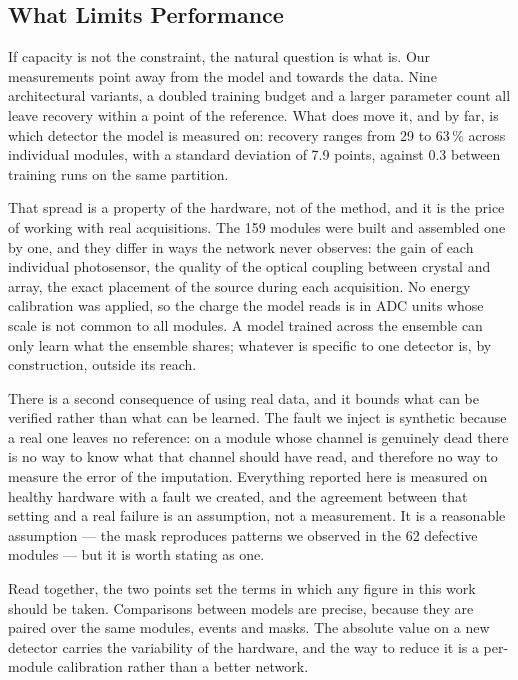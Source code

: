 \documentclass[10pt,conference]{IEEEtran}
\begin{document}
\subsection{What Limits Performance}
\label{sec:disc-limits}

If capacity is not the constraint, the natural question is what is. Our
measurements point away from the model and towards the data. Nine architectural
variants, a doubled training budget and a larger parameter count all leave
recovery within a point of the reference. What does move it, and by far, is
which detector the model is measured on: recovery ranges from 29 to 63\,\%
across individual modules, with a standard deviation of 7.9 points, against 0.3
between training runs on the same partition.

That spread is a property of the hardware, not of the method, and it is the
price of working with real acquisitions. The 159 modules were built and
assembled one by one, and they differ in ways the network never observes: the
gain of each individual photosensor, the quality of the optical coupling
between crystal and array, the exact placement of the source during each
acquisition. No energy calibration was applied, so the charge the model reads
is in ADC units whose scale is not common to all modules. A model trained
across the ensemble can only learn what the ensemble shares; whatever is
specific to one detector is, by construction, outside its reach.

There is a second consequence of using real data, and it bounds what can be
verified rather than what can be learned. The fault we inject is synthetic
because a real one leaves no reference: on a module whose channel is genuinely
dead there is no way to know what that channel should have read, and therefore
no way to measure the error of the imputation. Everything reported here is
measured on healthy hardware with a fault we created, and the agreement between
that setting and a real failure is an assumption, not a measurement. It is a
reasonable assumption --- the mask reproduces patterns we observed in the 62
defective modules --- but it is worth stating as one.

Read together, the two points set the terms in which any figure in this work
should be taken. Comparisons between models are precise, because they are
paired over the same modules, events and masks. The absolute value on a new
detector carries the variability of the hardware, and the way to reduce it is a
per-module calibration rather than a better network.
\end{document}

